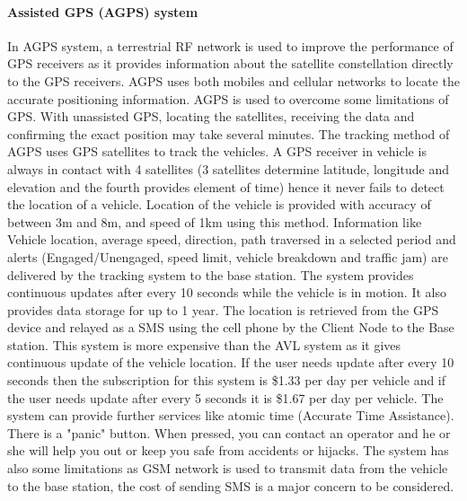 \paragraph{Assisted GPS (AGPS) system}
In AGPS system, a terrestrial RF network is used to
improve the performance of GPS receivers as it provides information about the satellite
constellation directly to the GPS receivers. AGPS uses both mobiles and cellular
networks to locate the accurate positioning information. AGPS is used to overcome some
limitations of GPS. With unassisted GPS, locating the satellites, receiving the data and
confirming the exact position may take several minutes. The tracking method of AGPS
uses GPS satellites to track the vehicles. A GPS receiver in vehicle is always in contact
with 4 satellites (3 satellites determine latitude, longitude and elevation and the fourth
provides element of time) hence it never fails to detect the location of a vehicle. Location
of the vehicle is provided with accuracy of between 3m and 8m, and speed of 1km using
this method. Information like Vehicle location, average speed, direction, path traversed in
a selected period and alerts (Engaged/Unengaged, speed limit, vehicle breakdown and
traffic jam) are delivered by the tracking system to the base station. The system provides
continuous updates after every 10 seconds while the vehicle is in motion. It also provides
data storage for up to 1 year. The location is retrieved from the GPS device and relayed
as a SMS using the cell phone by the Client Node to the Base station. This system is
more expensive than the AVL system as it gives continuous update of the vehicle
location. If the user needs update after every 10 seconds then the subscription for this
system is \$1.33 per day per vehicle and if the user needs update after every 5 seconds it is \$1.67 per day per vehicle. The system can provide further services like atomic time
(Accurate Time Assistance). There is a "panic" button. When pressed, you can contact an
operator and he or she will help you out or keep you safe from accidents or hijacks. The
system has also some limitations as GSM network is used to transmit data from the
vehicle to the base station, the cost of sending SMS is a major concern to be considered.

